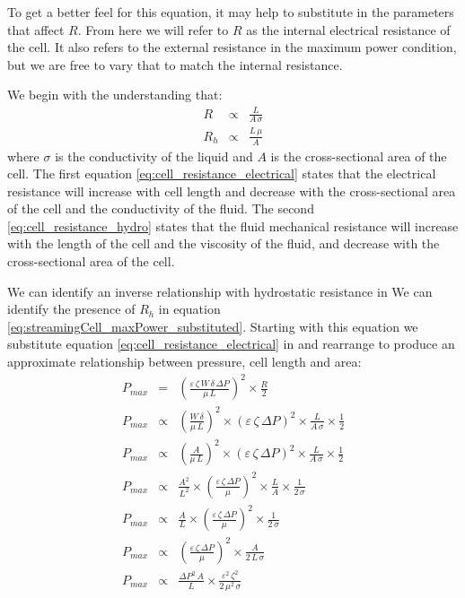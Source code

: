 To get a better feel for this equation, it may help to substitute in the parameters that affect $R$.
From here we will refer to $R$ as the internal electrical resistance of the cell.
It also refers to the external resistance in the maximum power condition, but we are free to vary that to match the internal resistance.

We begin with the understanding that:
\begin{eqnarray}
    R & \propto & \frac{L}{A\,\sigma}\label{eq:cell_resistance_electrical}\\
    R_{h} & \propto & \frac{L\,\mu}{A}\label{eq:cell_resistance_hydro}
\end{eqnarray}
where $\sigma$ is the conductivity of the liquid and $A$ is the cross-sectional area of the cell.
The first equation \eqref{eq:cell_resistance_electrical} states that the electrical resistance will increase with cell length and decrease with the cross-sectional area of the cell and the conductivity of the fluid.
The second \eqref{eq:cell_resistance_hydro} states that the fluid mechanical resistance will increase with the length of the cell and the viscosity of the fluid, and decrease with the cross-sectional area of the cell.

We can identify an inverse relationship with hydrostatic resistance in
We can identify the presence of $R_{h}$ in equation \eqref{eq:streamingCell_maxPower_substituted}.
Starting with this equation we substitute equation \eqref{eq:cell_resistance_electrical} in and rearrange to produce an approximate relationship between pressure, cell length and area:
\begin{eqnarray}
    P_{max} & = & \left(\frac{\varepsilon\,\zeta\,W\,\delta\,\Delta P}{\mu\,L}\right)^{2}\times\frac{R}{2}\nonumber\\
    P_{max} & \propto & \left(\frac{W\,\delta}{\mu\,L}\right)^{2}\times\left(\varepsilon\,\zeta\,\Delta P\right)^{2}\times \frac{L}{A\,\sigma} \times\frac{1}{2}\nonumber\\
    P_{max} & \propto & \left(\frac{A}{\mu\,L}\right)^{2}\times\left(\varepsilon\,\zeta\,\Delta P\right)^{2}\times \frac{L}{A\,\sigma} \times\frac{1}{2}\nonumber\\
    P_{max} & \propto & \frac{A^{2}}{L^{2}}\times\left(\frac{\varepsilon\,\zeta\,\Delta P}{\mu}\right)^{2}\times \frac{L}{A} \times\frac{1}{2\,\sigma}\nonumber\\
    P_{max} & \propto & \frac{A}{L}\times\left(\frac{\varepsilon\,\zeta\,\Delta P}{\mu}\right)^{2}\times\frac{1}{2\,\sigma}\nonumber\\
    P_{max} & \propto & \left(\frac{\varepsilon\,\zeta\,\Delta P}{\mu}\right)^{2}\times\frac{A}{2\,L\,\sigma}\nonumber\\
    P_{max} & \propto & \frac{\Delta P^{2}\,A}{L}\times \frac{\varepsilon^{2}\,\zeta^{2}}{2\,\mu^{2}\,\sigma}
    \label{eq:streamingCell_maxPower_relationship}
\end{eqnarray}

